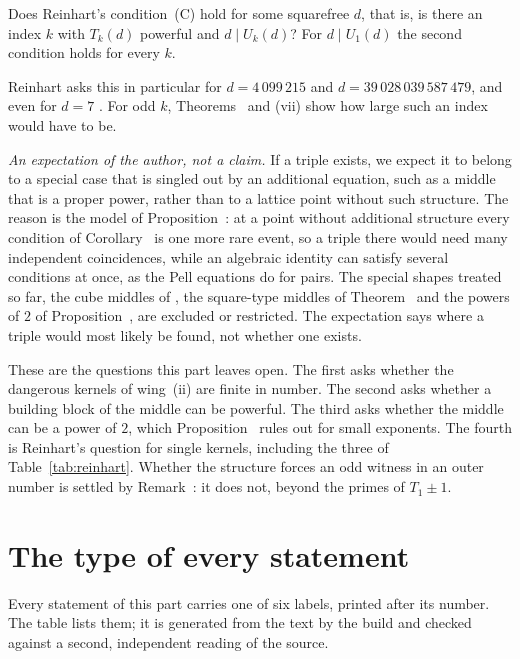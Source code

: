 \begin{question}
Does Reinhart's condition~(C) \cite[Definition~1.4]{Reinhart2024} hold for some squarefree $d$, that is, is there an index $k$ with
$T_k(d)$ powerful and $d \mid U_k(d)$? For $d \mid U_1(d)$ the second condition holds for every $k$.
\end{question}

Reinhart asks this in particular for $d = 4\,099\,215$ and $d = 39\,028\,039\,587\,479$, and even for $d = 7$ \cite[p.~6]{Reinhart2024}. For
odd $k$, Theorems~ and (vii) show how large such an index would have to be.

\emph{An expectation of the author, not a claim.} If a triple exists, we expect it to belong to a special case that is singled out by an
additional equation, such as a middle that is a proper power, rather than to a lattice point without such structure. The reason is the
model of Proposition~: at a point without additional structure every condition of Corollary~ is one
more rare event, so a triple there would need many independent coincidences, while an algebraic identity can satisfy several conditions
at once, as the Pell equations do for pairs. The special shapes treated so far, the cube middles of \cite{Chan2025,She2025,Sayim2026EMW},
the square-type middles of Theorem~ and the powers of $2$ of Proposition~, are excluded or
restricted. The expectation says where a triple would most likely be found, not whether one exists.

\inwords These are the questions this part leaves open. The first asks whether the dangerous kernels of wing~(ii) are finite in number.
The second asks whether a building block of the middle can be powerful. The third asks whether the middle can be a power of $2$,
which Proposition~ rules out for small exponents. The fourth is Reinhart's question for single kernels, including
the three of Table~\ref{tab:reinhart}. Whether the structure forces an odd witness in an outer number is settled by Remark~: it does not, beyond the primes of $T_1 \pm 1$.

\section*{The type of every statement}

Every statement of this part carries one of six labels, printed after its number. The table lists them; it is generated from the text by the build and checked against a second, independent reading of the source.


